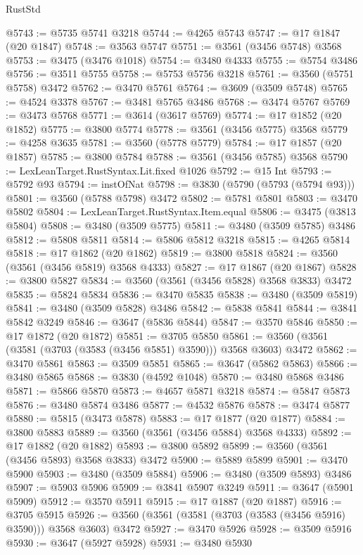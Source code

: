 \begin{lexlean}{RustStd}
\begin{coremodule}
{\begin{coremodule}
{{{{{{{{{{{{{{{{{{{{{{{{{{{{{{{{{{{{{{{{{{{{{@5743 := @5735 @5741 @3218
@5744 := @4265 @5743
@5747 := @17 @1847 (@20 @1847)
@5748 := @3563 @5747
@5751 := @3561 (@3456 @5748) @3568
@5753 := @3475 (@3476 @1018)
@5754 := @3480 @4333
@5755 := @5754 @3486
@5756 := @3511 @5755
@5758 := @5753 @5756 @3218
@5761 := @3560 (@5751 @5758) @3472
@5762 := @3470 @5761
@5764 := @3609 (@3509 @5748)
@5765 := @4524 @3378
@5767 := @3481 @5765 @3486
@5768 := @3474 @5767
@5769 := @3473 @5768
@5771 := @3614 (@3617 @5769)
@5774 := @17 @1852 (@20 @1852)
@5775 := @3800 @5774
@5778 := @3561 (@3456 @5775) @3568
@5779 := @4258 @3635
@5781 := @3560 (@5778 @5779)
@5784 := @17 @1857 (@20 @1857)
@5785 := @3800 @5784
@5788 := @3561 (@3456 @5785) @3568
@5790 := LexLeanTarget.RustSyntax.Lit.fixed @1026
@5792 := @15 Int
@5793 := @5792 @93
@5794 := instOfNat
@5798 := @3830 (@5790 (@5793 (@5794 @93)))
@5801 := @3560 (@5788 @5798) @3472
@5802 := @5781 @5801
@5803 := @3470 @5802
@5804 := LexLeanTarget.RustSyntax.Item.equal
@5806 := @3475 (@3813 @5804)
@5808 := @3480 (@3509 @5775)
@5811 := @3480 (@3509 @5785) @3486
@5812 := @5808 @5811
@5814 := @5806 @5812 @3218
@5815 := @4265 @5814
@5818 := @17 @1862 (@20 @1862)
@5819 := @3800 @5818
@5824 := @3560 (@3561 (@3456 @5819) @3568 @4333)
@5827 := @17 @1867 (@20 @1867)
@5828 := @3800 @5827
@5834 := @3560 (@3561 (@3456 @5828) @3568 @3833) @3472
@5835 := @5824 @5834
@5836 := @3470 @5835
@5838 := @3480 (@3509 @5819)
@5841 := @3480 (@3509 @5828) @3486
@5842 := @5838 @5841
@5844 := @3841 @5842 @3249
@5846 := @3647 (@5836 @5844)
@5847 := @3570 @5846
@5850 := @17 @1872 (@20 @1872)
@5851 := @3705 @5850
@5861 := @3560 (@3561 (@3581 (@3703 (@3583 (@3456 @5851) @3590))) @3568 @3603) @3472
@5862 := @3470 @5861
@5863 := @3509 @5851
@5865 := @3647 (@5862 @5863)
@5866 := @3480 @5865
@5868 := @3830 (@4592 @1048)
@5870 := @3480 @5868 @3486
@5871 := @5866 @5870
@5873 := @4657 @5871 @3218
@5874 := @5847 @5873
@5876 := @3480 @5874 @3486
@5877 := @4532 @5876
@5878 := @3474 @5877
@5880 := @5815 (@3473 @5878)
@5883 := @17 @1877 (@20 @1877)
@5884 := @3800 @5883
@5889 := @3560 (@3561 (@3456 @5884) @3568 @4333)
@5892 := @17 @1882 (@20 @1882)
@5893 := @3800 @5892
@5899 := @3560 (@3561 (@3456 @5893) @3568 @3833) @3472
@5900 := @5889 @5899
@5901 := @3470 @5900
@5903 := @3480 (@3509 @5884)
@5906 := @3480 (@3509 @5893) @3486
@5907 := @5903 @5906
@5909 := @3841 @5907 @3249
@5911 := @3647 (@5901 @5909)
@5912 := @3570 @5911
@5915 := @17 @1887 (@20 @1887)
@5916 := @3705 @5915
@5926 := @3560 (@3561 (@3581 (@3703 (@3583 (@3456 @5916) @3590))) @3568 @3603) @3472
@5927 := @3470 @5926
@5928 := @3509 @5916
@5930 := @3647 (@5927 @5928)
@5931 := @3480 @5930
}}}}}}}}}}}}}}}}}}}}}}}}}}}}}}}}}}}}}}}}}}}}}
\end{coremodule}}
\end{coremodule}
\end{lexlean}
